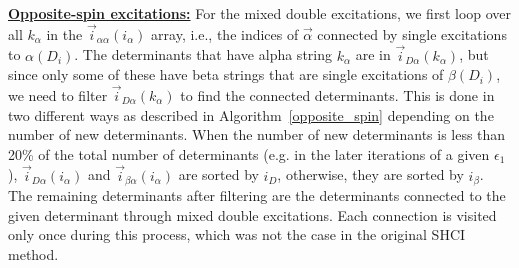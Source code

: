 \documentclass[%
preprint,
 superscriptaddress,
 amsmath,amssymb,
 aps,
]{revtex4-1}
\def\vecD{\vec{D}}
\def\veca{\vec{\alpha}}
\def\vecb{\vec{\beta}}
\def\ia{i_\alpha}
\def\ib{i_\beta}
\def\veciDa{\vec{i}_{D\alpha}}
\def\veciaa{\vec{i}_{\alpha\alpha}}
\def\veciba{\vec{i}_{\beta\alpha}}
\begin{document}
\noindent \underline{\bf Opposite-spin excitations:} For the mixed double excitations, we first loop over all $k_\alpha$ in the $\veciaa(\ia)$ array,
i.e., the indices of $\veca$ connected by single excitations to $\alpha(D_i)$.
The determinants that have alpha string $k_\alpha$ are in $\veciDa(k_\alpha)$, but since only some of these
have beta strings that are single excitations of $\beta(D_i)$, we need to filter $\veciDa(k_\alpha)$
to find the connected determinants.
This is done in two different ways as described in Algorithm~\ref{opposite_spin}
depending on the number of new determinants.
When the number of new determinants is less than 20\% of the total number of determinants (e.g. in the later iterations of a given $\epsilon_1$), $\veciDa(\ia)$ and $\veciba(\ia)$ are sorted by $i_D$, otherwise, they are sorted by $\ib$.
The remaining determinants after filtering are the determinants connected to the given determinant through mixed double excitations.
Each connection is visited only once during this process, which was not the case in the
original SHCI method.

\end{document}
